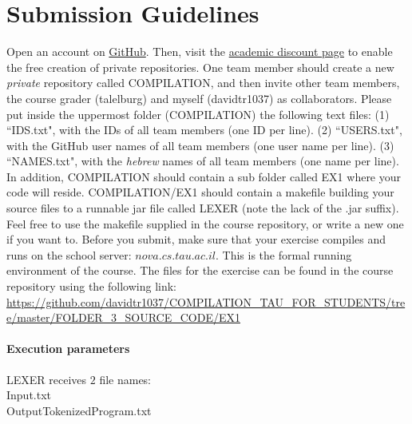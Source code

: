\documentclass{article}
\begin{document}
\section{Submission Guidelines}
Open an account on \href{https://github.com/}{GitHub}.
Then, visit the
\href{https://education.github.com/discount_requests/new}{academic discount page}
to enable the free creation of private repositories.
One team member should create a new \textit{private} repository called COMPILATION,
and then invite other team members, the course grader (talelburg) and myself (davidtr1037)
as collaborators.
Please put inside the uppermost folder (COMPILATION) the following text files:
(1) ``IDS.txt", with the IDs of all team members (one ID per line).
(2) ``USERS.txt", with the GitHub user names of all team members (one user name per line).
(3) ``NAMES.txt", with the \textit{hebrew} names of all team members (one name per line).
In addition, COMPILATION should contain a sub folder called EX1
where your code will reside.
COMPILATION/EX1 should contain a makefile building your source files to a
runnable jar file called LEXER (note the lack of the .jar suffix).
Feel free to use the makefile supplied in the course repository,
or write a new one if you want to. 
Before you submit, make sure that your exercise compiles and runs
on the school server: $nova.cs.tau.ac.il$.
This is the formal running environment of the course.
The files for the exercise can be found in the course repository using the following link: \\
\url{https://github.com/davidtr1037/COMPILATION_TAU_FOR_STUDENTS/tree/master/FOLDER_3_SOURCE_CODE/EX1}

\paragraph{Execution parameters}
LEXER receives $2$ file names:\\
Input.txt\\
OutputTokenizedProgram.txt
\end{document}
